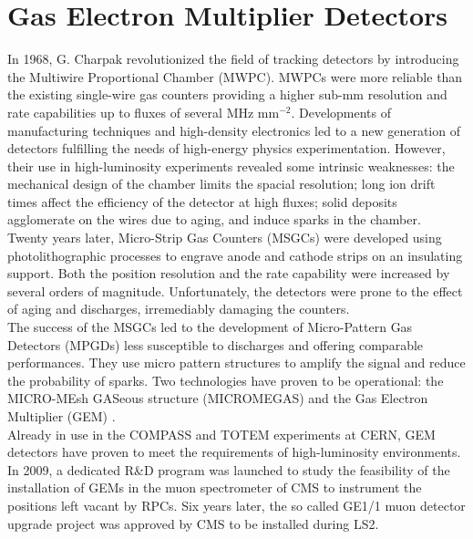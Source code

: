 \chapter{Gas Electron Multiplier Detectors}
\label{chap:II-1-gem}

  In 1968, G. Charpak revolutionized the field of tracking detectors by introducing the Multiwire Proportional Chamber (MWPC). MWPCs were more reliable than the existing single-wire gas counters providing a higher sub-mm resolution and rate capabilities up to fluxes of several MHz mm$^{-2}$. Developments of manufacturing techniques and high-density electronics led to a new generation of detectors fulfilling the needs of high-energy physics experimentation. However, their use in high-luminosity experiments revealed some intrinsic weaknesses: the mechanical design of the chamber limits the spacial resolution; long ion drift times affect the efficiency of the detector at high fluxes; solid deposits agglomerate on the wires due to aging, and induce sparks in the chamber. \\

  Twenty years later, Micro-Strip Gas Counters (MSGCs) \cite{Alunni:254631} were developed using photolithographic processes to engrave anode and cathode strips on an insulating support. Both the position resolution and the rate capability were increased by several orders of magnitude. Unfortunately, the detectors were prone to the effect of aging and discharges, irremediably damaging the counters. \\

  The success of the MSGCs led to the development of Micro-Pattern Gas Detectors (MPGDs) less susceptible to discharges and offering comparable performances. They use micro pattern structures to amplify the signal and reduce the probability of sparks. Two technologies have proven to be operational: the MICRO-MEsh GASeous structure (MICROMEGAS) \cite{Giomataris:299159} and the Gas Electron Multiplier (GEM) \cite{SAULI1997531}. \\

  Already in use in the COMPASS and TOTEM experiments at CERN, GEM detectors have proven to meet the requirements of high-luminosity environments. In 2009, a dedicated R\&D program was launched to study the feasibility of the installation of GEMs in the muon spectrometer of CMS to instrument the positions left vacant by RPCs. Six years later, the so called GE1/1 \cite{Colaleo:2021453} muon detector upgrade project was approved by CMS to be installed during LS2.

